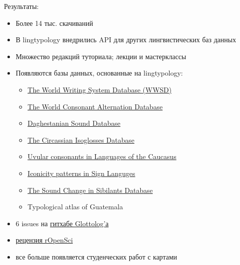 \documentclass[13pt, t]{beamer}
\begin{document}
\begin{frame}{Результаты:}
\begin{itemize}
\item Более 14 тыс. скачиваний \pause
\item В lingtypology внедрились API для других лингвистических баз данных\pause
\item Множество редакций туториала; лекции и мастерклассы
\item Появляются базы данных, основанные на lingtypology:
\begin{itemize}
\item \href{https://agricolamz.github.io/wwsd/}{The World Writing System Database  (WWSD)}
\item \href{https://agricolamz.github.io/wcad/}{The World Consonant Alternation Database}
\item \href{https://daghestanian-sound-database.herokuapp.com/}{Daghestanian Sound Database}
\item \href{https://agricolamz.github.io/The_Circassian_Isoglosses_Database/}{The Circassian Isoglosses Database}
\item \href{https://agricolamz.github.io/uvular_database/}{Uvular consonants in Languages of the Caucasus}
\item \href{https://sl-iconicity.shinyapps.io/iconicity_patterns/}{Iconicity patterns in Sign Languges}
\item \href{https://agricolamz.github.io/scsd/}{The Sound Change in Sibilants Database}
\item Typological atlas of Guatemala \pause
\end{itemize}
\item 6 issues на \href{https://github.com/clld/glottolog}{гитхабе Glottolog'а} \pause
\item \href{https://github.com/ropensci/software-review/issues/95}{рецензия rOpenSci} \pause
\item все больше появляется студенческих работ с картами
\end{itemize}
\end{frame}

\end{document}
